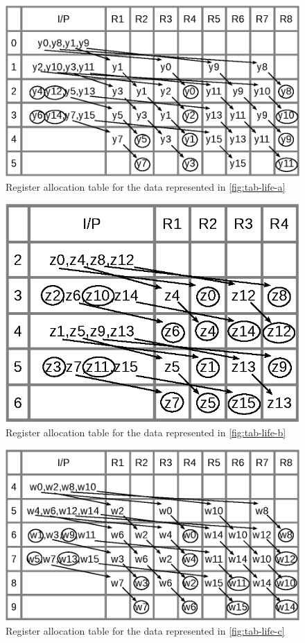 \documentclass[journal,comsoc]{IEEEtran}
\begin{document}
\begin{figure} 
\centering
 \includegraphics[width=0.9\linewidth]{Diagramas/tab_life_a.eps}
\caption{Register allocation table for the data represented in \ref{fig:tab-life-a}}
\label{fig:tab-aloc-a}
\end{figure}
\begin{figure} 
\centering
 \includegraphics[width=0.63\linewidth]{Diagramas/tab_life_b.eps}
\caption{Register allocation table for the data represented in \ref{fig:tab-life-b}}
\label{fig:tab-aloc-b}
\end{figure}
\begin{figure} 
\centering
 \includegraphics[width=0.95\linewidth]{Diagramas/tab_life_c.eps}
\caption{Register allocation table for the data represented in \ref{fig:tab-life-c}}
\label{fig:tab-aloc-c}
\end{figure}
\end{document}
